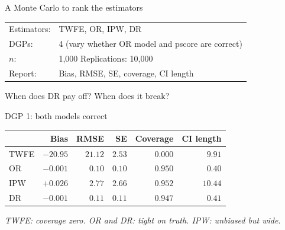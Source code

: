 \documentclass[aspectratio=169,11pt]{beamer}
\begin{document}

\begin{frame}{A Monte Carlo to rank the estimators}
\vspace{0.6em}
\begin{center}
\begin{tabular}{ll}
  Estimators: & TWFE, OR, IPW, DR \\[0.4em]
  DGPs:       & 4 (vary whether OR model and pscore are correct) \\[0.4em]
  $n$:        & 1{,}000 \quad Replications: 10{,}000 \\[0.4em]
  Report:     & Bias, RMSE, SE, coverage, CI length \\
\end{tabular}
\end{center}
\vspace{0.5em}
\begin{center}
\color{warmgray}\small
When does DR pay off? When does it break?
\end{center}
\end{frame}

\begin{frame}{DGP 1: both models correct}
\vspace{0.4em}
\begin{center}
\small\renewcommand{\arraystretch}{1.3}
\begin{tabular}{@{}lrrrrr@{}}
\toprule
      & \textbf{Bias} & \textbf{RMSE} & \textbf{SE} & \textbf{Coverage} & \textbf{CI length} \\
\midrule
TWFE  & $-20.95$ & $21.12$ & $2.53$ & $0.000$ & $9.91$  \\
OR    & $-0.001$ & $0.10$  & $0.10$ & $0.950$ & $0.40$  \\
IPW   & $+0.026$ & $2.77$  & $2.66$ & $0.952$ & $10.44$ \\
\rowcolor{remixgreenlight}
DR    & $-0.001$ & $0.11$  & $0.11$ & $0.947$ & $0.41$  \\
\bottomrule
\end{tabular}
\end{center}
\vspace{0.3em}
\begin{center}\small\color{warmgray}\itshape
TWFE: coverage zero. \;OR and DR: tight on truth. \;IPW: unbiased but wide.
\end{center}
\end{frame}
\end{document}
